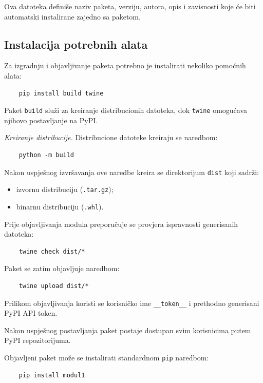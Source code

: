 Ova datoteka definiše naziv paketa, verziju, autora, opis i zavisnosti koje će biti automatski instalirane zajedno sa paketom.

\subsection*{Instalacija potrebnih alata}

Za izgradnju i objavljivanje paketa potrebno je instalirati nekoliko pomoćnih alata:

\begin{verbatim}
	pip install build twine
\end{verbatim}

Paket \texttt{build} služi za kreiranje distribucionih datoteka, dok \texttt{twine} omogućava njihovo postavljanje na PyPI.

\textit{Kreiranje distribucije.} Distribucione datoteke kreiraju se naredbom:

\begin{verbatim}
	python -m build
\end{verbatim}

Nakon uspješnog izvršavanja ove naredbe kreira se direktorijum \texttt{dist} koji sadrži:

\begin{itemize}
	\item izvornu distribuciju (\texttt{.tar.gz});
	\item binarnu distribuciju (\texttt{.whl}).
\end{itemize}


Prije objavljivanja modula preporučuje se provjera ispravnosti generisanih datoteka:

\begin{verbatim}
	twine check dist/*
\end{verbatim}

Paket se zatim objavljuje naredbom:

\begin{verbatim}
	twine upload dist/*
\end{verbatim}

Prilikom objavljivanja koristi se korisničko ime \texttt{\_\_token\_\_} i prethodno generisani PyPI API token.

Nakon uspješnog postavljanja paket postaje dostupan svim korisnicima putem PyPI repozitorijuma.


Objavljeni paket može se instalirati standardnom \texttt{pip} naredbom:

\begin{verbatim}
	pip install modul1
\end{verbatim}


